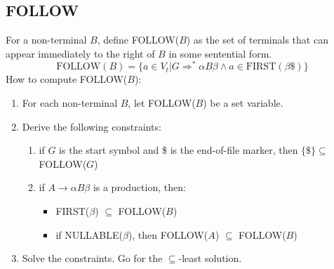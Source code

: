 \documentclass[10pt]{article}
\begin{document}
\subsection*{FOLLOW}
For a non-terminal $B$, define FOLLOW($B$) as the set of terminals that can appear immediately to the right of $B$ in some sentential form.
\[\text{FOLLOW}(B) = \{a \in V_t \vert G \Rightarrow^* \alpha B \beta \land a \in \text{FIRST}(\beta \$)\}\]
How to compute FOLLOW($B$):
\begin{enumerate}
    \item For each non-terminal $B$, let FOLLOW($B$) be a set variable.
    \item Derive the following constraints:
    \begin{enumerate}
        \item if $G$ is the start symbol and \$ is the end-of-file marker, then $\{\$\} \subseteq$ FOLLOW($G$)
        \item if $A \rightarrow \alpha B \beta$ is a production, then:
        \begin{itemize}
            \item FIRST($\beta$) $\subseteq$ FOLLOW($B$)
            \item if NULLABLE($\beta$), then FOLLOW($A$) $\subseteq$ FOLLOW($B$)
        \end{itemize}
    \end{enumerate}
    \item Solve the constraints.  Go for the $\subseteq$-least solution.
\end{enumerate}
\end{document}
